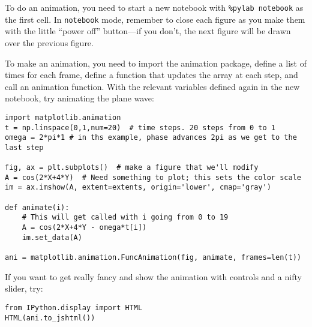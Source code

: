 \documentclass[11pt]{hmcpset}
\begin{document}
\begin{problem}
	To do an animation, you need to start a new notebook with \texttt{\%pylab notebook} as the first cell. In \texttt{notebook} mode, remember to close each figure as you make them with the little ``power off'' button---if you don't, the next figure will be drawn over the previous figure.
	
	To make an animation, you need to import the animation package, define a list of times for each frame, define a function that updates the array at each step, and call an animation function. With the relevant variables defined again in the new notebook, try animating the plane wave:
\begin{lstlisting}[style=Python]
import matplotlib.animation
t = np.linspace(0,1,num=20)  # time steps. 20 steps from 0 to 1
omega = 2*pi*1 # in ths example, phase advances 2pi as we get to the last step

fig, ax = plt.subplots()  # make a figure that we'll modify
A = cos(2*X+4*Y)  # Need something to plot; this sets the color scale
im = ax.imshow(A, extent=extents, origin='lower', cmap='gray')

def animate(i):
    # This will get called with i going from 0 to 19
    A = cos(2*X+4*Y - omega*t[i])
    im.set_data(A)

ani = matplotlib.animation.FuncAnimation(fig, animate, frames=len(t))
\end{lstlisting}
If you want to get really fancy and show the animation with controls and a nifty slider, try:
\begin{lstlisting}[style=Python]
from IPython.display import HTML
HTML(ani.to_jshtml())
\end{lstlisting}
	\end{problem}
	\pagebreak
\end{document}
